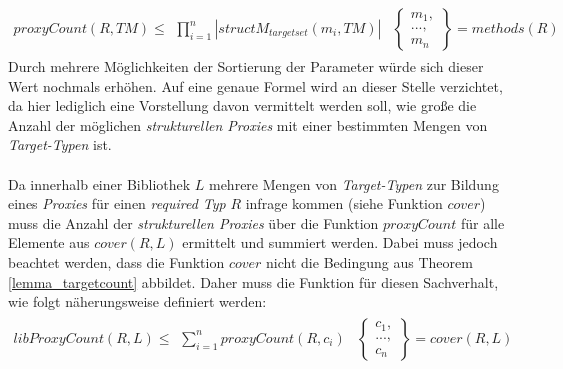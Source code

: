 \begin{gather*}
\mathit{proxyCount(R,TM)} \leq 
\begin{array}{l|l}
\prod\limits_{i=1}^{n}|\mathit{structM_{targetset}(m_i, TM)}|
&
\left\{
\begin{array}{l}
m_1,\\
...,\\
m_n
\end{array}
\right\}
= \mathit{methods(R)}
\end{array}
\end{gather*}
\noindent
Durch mehrere Möglichkeiten der Sortierung der Parameter würde sich dieser Wert nochmals erhöhen. Auf eine genaue Formel wird an dieser Stelle verzichtet, da hier lediglich eine Vorstellung davon vermittelt werden soll, wie große die Anzahl der möglichen \emph{strukturellen Proxies} mit einer bestimmten Mengen von \emph{Target-Typen} ist.
\\\\
Da innerhalb einer Bibliothek $L$ mehrere Mengen von \emph{Target-Typen} zur Bildung eines \emph{Proxies} für einen \emph{required Typ} $R$ infrage kommen (siehe Funktion $\mathit{cover}$) muss die Anzahl der \emph{strukturellen Proxies} über die Funktion $\mathit{proxyCount}$ für alle Elemente aus $\mathit{cover(R,L)}$ ermittelt und summiert werden. Dabei muss jedoch beachtet werden, dass die Funktion $\mathit{cover}$ nicht die Bedingung aus Theorem \ref{lemma_targetcount} abbildet. Daher muss die Funktion für diesen Sachverhalt, wie folgt näherungsweise definiert werden:
\begin{gather*}
\mathit{libProxyCount(R,L)} \leq 
\begin{array}{l|l}
\sum_{i=1}^{n}\mathit{proxyCount(R,c_i)}
&
\left\{
\begin{array}{l}
c_1,\\
...,\\
c_n
\end{array}
\right\} = \mathit{cover(R,L)}
\end{array}
\end{gather*}